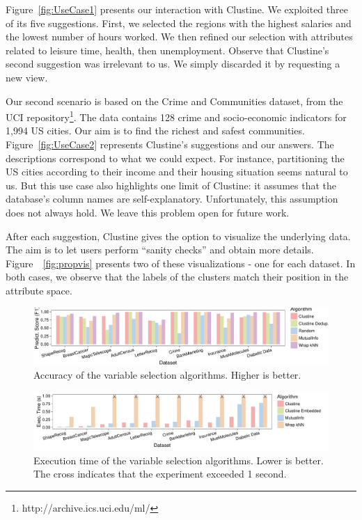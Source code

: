 Figure~\ref{fig:UseCase1} presents our interaction with Clustine. We exploited
three of its five suggestions. First, we selected the regions with the highest
salaries and the lowest number of hours worked.  We then refined our selection
with attributes related to leisure time, health, then unemployment. Observe
that Clustine's second suggestion was irrelevant to us. We simply discarded it by
requesting a new view.

Our second scenario is based on the Crime and Communities dataset, from the UCI
repository\footnote{http://archive.ics.uci.edu/ml/}. The data contains 128
crime and socio-economic indicators for 1,994 US cities. Our aim is to find the
richest and safest communities. Figure~\ref{fig:UseCase2} represents Clustine's
suggestions and our answers. The descriptions correspond to what we could
expect.  For instance, partitioning the US cities according to their income and
their housing situation seems natural to us. But this use case also highlights
one limit of Clustine: it assumes that the database's column names are
self-explanatory. Unfortunately, this assumption does not always hold. We leave
this problem open for future work.

After each suggestion, Clustine gives the option to visualize the underlying
data. The aim is to let users perform ``sanity checks'' and obtain more
details. Figure~~\ref{fig:propvis} presents two of these visualizations - one
for each dataset. In both cases, we observe that the labels of the clusters
match their position in the attribute space.




\begin{figure}[!t]
  \centering
  \includegraphics[width=\textwidth]{Experiments/F1_Scores}
  \caption{Accuracy of the variable selection algorithms. Higher is better.}\label{pic:accuracy}
\end{figure}
\begin{figure}[!t]
  \centering
  \includegraphics[width=\textwidth]{Experiments/Timings}
  \caption{Execution time of the variable selection algorithms. Lower is
  better. The cross indicates that the experiment exceeded 1 second.}
  \label{pic:runtime}
\end{figure}

